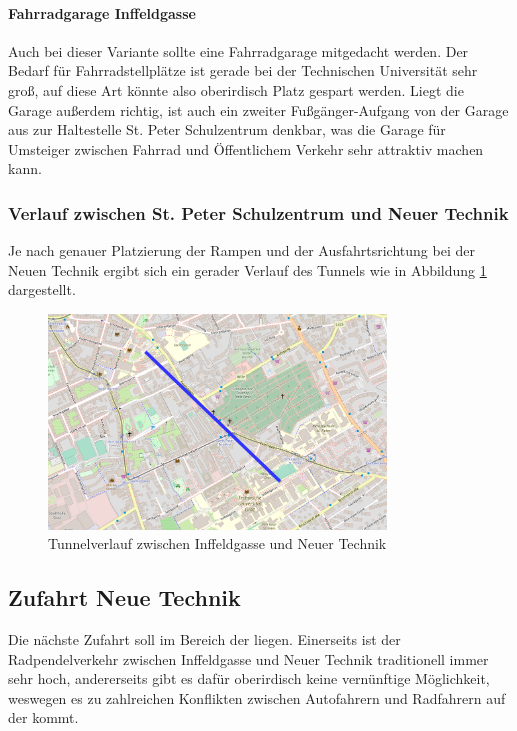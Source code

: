 \paragraph{Fahrradgarage Inffeldgasse}
Auch bei dieser Variante sollte eine Fahrradgarage mitgedacht werden. Der Bedarf für Fahrradstellplätze ist gerade bei der Technischen Universität sehr groß, auf diese Art könnte also oberirdisch Platz gespart werden. Liegt die Garage außerdem richtig, ist auch ein zweiter Fußgänger-Aufgang von der Garage aus zur Haltestelle St. Peter Schulzentrum denkbar, was die Garage für Umsteiger zwischen Fahrrad und Öffentlichem Verkehr sehr attraktiv machen kann.

\subsubsection{Verlauf zwischen St. Peter Schulzentrum und Neuer Technik}
Je nach genauer Platzierung der Rampen und der Ausfahrtsrichtung bei der Neuen Technik ergibt sich ein gerader Verlauf des Tunnels wie in Abbildung \ref{fig:uni_verlauf1} dargestellt.

\begin{figure}
    \centering
    \includegraphics[width=0.8\textwidth]{main/bike/tunnel/uni/verlauf1}
    \caption[Tunnelverlauf zwischen Inffeldgasse und Neuer Technik]{Tunnelverlauf zwischen Inffeldgasse und Neuer Technik}
    \label{fig:uni_verlauf1}
\end{figure}

\subsection{Zufahrt Neue Technik}
Die nächste Zufahrt soll im Bereich der  liegen. Einerseits ist der Radpendelverkehr zwischen Inffeldgasse und Neuer Technik traditionell immer sehr hoch, andererseits gibt es dafür oberirdisch keine vernünftige Möglichkeit, weswegen es zu zahlreichen Konflikten zwischen Autofahrern und Radfahrern auf der  kommt.


